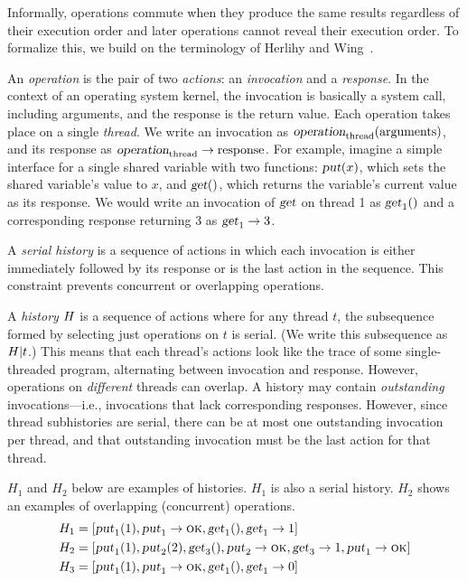 Informally, operations commute when 
they produce the same results regardless of their execution order
and later operations cannot reveal their execution order.  To
formalize this, we build on the terminology of Herlihy and
Wing~\cite{herlihy:linearizability}.


An \emph{operation} is the pair of two \emph{actions}: an
\emph{invocation} and a \emph{response}. In the context of an
operating system kernel, the invocation is basically a system call,
including arguments, and the response is the return value. Each
operation takes place on a single \emph{thread}.
We write an invocation as 
$\INV{operation}{\text{arguments}}{\text{thread}}$, and its response
as $\RES{operation}{\text{response}}{\text{thread}}$.
For example, imagine a
simple interface for a single shared variable with two
functions: $\OP{put}(x)$, which sets the shared variable's value to $x$,
and $\OP{get}()$, which returns the
variable's current value as its response.  We would write an invocation
of $\OP{get}$ on thread 1 as $\INV{get}{}{1}$ and a corresponding
response returning $3$ as $\RES{get}{3}{1}$.

A \emph{serial history} is a sequence of actions in which each
invocation is either immediately followed by its response or is the last
action in the sequence.  This constraint prevents concurrent or
overlapping operations.

A \emph{history} $\HIST{H}$ is a sequence of actions where for any
thread $t$, the subsequence formed by selecting just operations on $t$
is serial. (We write this subsequence as $\HRESTRICT{\HIST{H}}{t}$.)
%
This means that each thread's actions look like the trace of
some single-threaded program, alternating between invocation and
response. However, operations on \emph{different} threads can overlap.
%
A history may contain \emph{outstanding} invocations---i.e., invocations
that lack corresponding responses. However, since thread subhistories
are serial, there can be at most one outstanding invocation per thread,
and that outstanding invocation must be the last action for that
thread.

$H_1$ and $H_2$ below are examples of histories.  $H_1$ is also a serial
history.  $H_2$ shows an examples of overlapping (concurrent)
operations.
\begin{align*}
  H_1 = [&\INV{put}{1}{1}, \RES{put}{\OK}{1}, \INV{get}{}{1},
  \RES{get}{1}{1}] \\
  H_2 = [&\INV{put}{1}{1}, \INV{put}{2}{2}, \INV{get}{}{3},
  \RES{put}{\OK}{2}, \RES{get}{1}{3}, \RES{put}{\OK}{1}] \\
  H_3 = [&\INV{put}{1}{1}, \RES{put}{\OK}{1}, \INV{get}{}{1},
  \RES{get}{0}{1}]
\end{align*}

